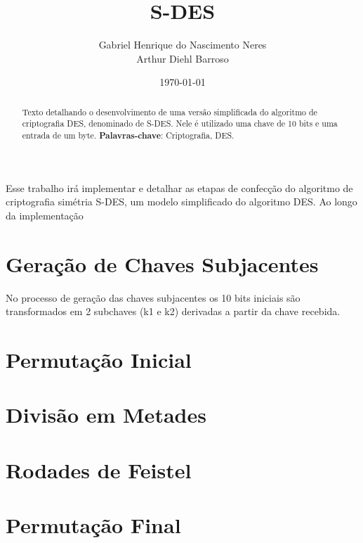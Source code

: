 \documentclass[12pt]{article}
\title{S-DES}
\author{Gabriel Henrique do Nascimento Neres \\ Arthur Diehl Barroso}
\date{\today}
\begin{document}
\maketitle

\begin{abstract}
  Texto detalhando o desenvolvimento de uma versão simplificada do algoritmo de criptografia DES, denominado de S-DES. Nele é utilizado uma chave de 10 bits e uma entrada de um byte.
  \textbf{Palavras-chave}: Criptografia, DES.
\end{abstract}

Esse trabalho irá implementar e detalhar as etapas de confecção do algoritmo de criptografia simétria S-DES, um modelo simplificado do algoritmo DES. Ao longo da implementação

\section{Geração de Chaves Subjacentes}
No processo de geração das chaves subjacentes os 10 bits iniciais são transformados em 2 subchaves (k1 e k2) derivadas a partir da chave recebida. 


\section{Permutação Inicial}

\section{Divisão em Metades}

\section{Rodades de Feistel}

\section{Permutação Final}
\end{document}
